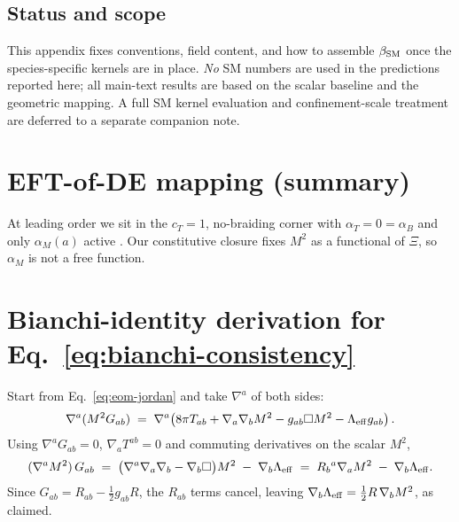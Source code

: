 \documentclass[aps,prd,onecolumn,superscriptaddress,nofootinbib]{revtex4-2}
\begin{document}
\subsection{Status and scope}
This appendix fixes conventions, field content, and how to assemble \(\beta_{\rm SM}\) once the species-specific kernels are in place. \emph{No} SM numbers are used in the predictions reported here; all main-text results are based on the scalar baseline and the geometric mapping. A full SM kernel evaluation and confinement-scale treatment are deferred to a separate companion note.

\section{EFT-of-DE mapping (summary)}
\label{app:eft}
At leading order we sit in the \(c_T=1\), no-braiding corner with \(\alpha_T=0=\alpha_B\) and only \(\alpha_M(a)\) active \cite{BelliniSawicki2014}. Our constitutive closure fixes \(M^2\) as a functional of \(\Xi\), so \(\alpha_M\) is not a free function.

\section{Bianchi-identity derivation for Eq.~\eqref{eq:bianchi-consistency}}
\label{app:bianchi-derivation}
Start from Eq.~\eqref{eq:eom-jordan} and take \(\nabla^a\) of both sides:
\[
\nabla^a(M^2 G_{ab}) \;=\; \nabla^a\!\left(8\pi T_{ab}+\nabla_a\nabla_b M^2-g_{ab}\Box M^2-\Lambda_{\rm eff} g_{ab}\right).
\]
Using \(\nabla^a G_{ab}=0\), \(\nabla_a T^{ab}=0\) and commuting derivatives on the scalar \(M^2\),
\[
(\nabla^a M^2)\,G_{ab} \;=\; \big(\nabla^a\nabla_a\nabla_b - \nabla_b\Box\big)M^2 \;-\; \nabla_b \Lambda_{\rm eff}
\;=\; R_b{}^{a}\nabla_a M^2 \;-\; \nabla_b \Lambda_{\rm eff}.
\]
Since \(G_{ab}=R_{ab}-\tfrac12 g_{ab}R\), the \(R_{ab}\) terms cancel, leaving
\(
\nabla_b \Lambda_{\rm eff} = \tfrac12 R\,\nabla_b M^2
\),
as claimed.
\end{document}
